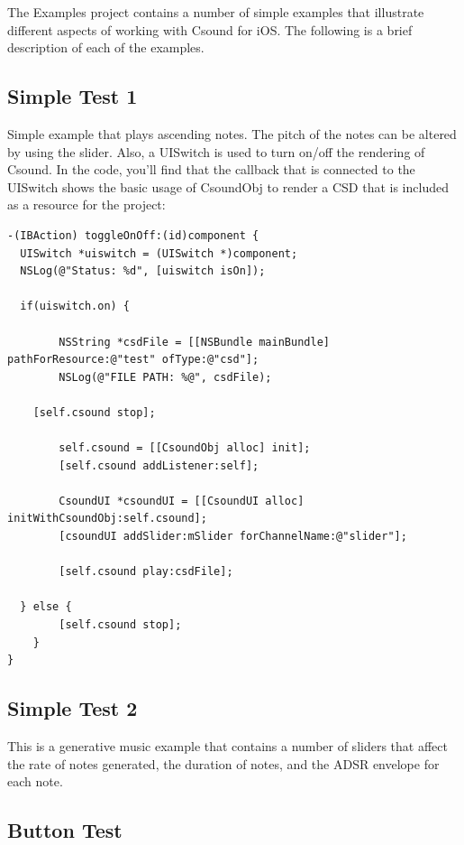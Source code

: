 \documentclass[11pt]{article}
\begin{document}
The Examples project contains a number of simple examples that illustrate different aspects of working with Csound for iOS.  The following is a brief description of each of the examples.

\subsection{Simple Test 1}

Simple example that plays ascending notes.  The pitch of the notes can be altered by using the slider.  Also, a UISwitch is used to turn on/off the rendering of Csound.  In the code, you'll find that the callback that is connected to the UISwitch shows the basic usage of CsoundObj to render a CSD that is included as a resource for the project:

\begin{lstlisting}[caption=Example code showing configuring and starting a CsoundObj]
-(IBAction) toggleOnOff:(id)component {
  UISwitch *uiswitch = (UISwitch *)component;
  NSLog(@"Status: %d", [uiswitch isOn]);

  if(uiswitch.on) {

        NSString *csdFile = [[NSBundle mainBundle] pathForResource:@"test" ofType:@"csd"];
        NSLog(@"FILE PATH: %@", csdFile);

    [self.csound stop];

        self.csound = [[CsoundObj alloc] init];
        [self.csound addListener:self];

        CsoundUI *csoundUI = [[CsoundUI alloc] initWithCsoundObj:self.csound];
        [csoundUI addSlider:mSlider forChannelName:@"slider"];

        [self.csound play:csdFile];

  } else {
        [self.csound stop];
    }
}

\end{lstlisting}

\subsection{Simple Test 2}

This is a generative music example that contains a number of sliders that affect the rate of notes generated, the duration of notes, and the ADSR envelope for each note.


\subsection{Button Test}
\end{document}
